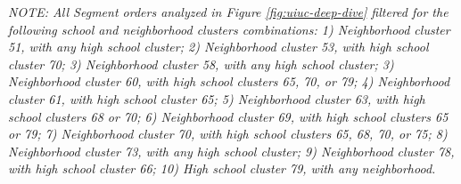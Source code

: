 \documentclass[
  12pt,
]{article}
\begin{document}
\emph{NOTE: All Segment orders analyzed in Figure \ref{fig:uiuc-deep-dive} filtered for the following school and neighborhood clusters combinations: 1) Neighborhood cluster 51, with any high school cluster; 2) Neighborhood cluster 53, with high school cluster 70; 3) Neighborhood cluster 58, with any high school cluster; 3) Neighborhood cluster 60, with high school clusters 65, 70, or 79; 4) Neighborhood cluster 61, with high school cluster 65; 5) Neighborhood cluster 63, with high school clusters 68 or 70; 6) Neighborhood cluster 69, with high school clusters 65 or 79; 7) Neighborhood cluster 70, with high school clusters 65, 68, 70, or 75; 8) Neighborhood cluster 73, with any high school cluster; 9) Neighborhood cluster 78, with high school cluster 66; 10) High school cluster 79, with any neighborhood.}
\endgroup

\clearpage
\end{document}
